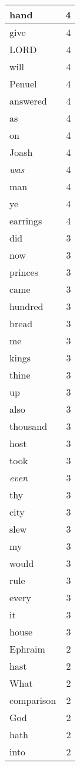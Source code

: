 \begin{center}
\begin{longtable}{l|r}
hand & 4\\ \hline 
give & 4\\ \hline 
LORD & 4\\ \hline 
will & 4\\ \hline 
Penuel & 4\\ \hline 
answered & 4\\ \hline 
as & 4\\ \hline 
on & 4\\ \hline 
Joash & 4\\ \hline 
\emph{was} & 4\\ \hline 
man & 4\\ \hline 
ye & 4\\ \hline 
earrings & 4\\ \hline 
did & 3\\ \hline 
now & 3\\ \hline 
princes & 3\\ \hline 
came & 3\\ \hline 
hundred & 3\\ \hline 
bread & 3\\ \hline 
me & 3\\ \hline 
kings & 3\\ \hline 
thine & 3\\ \hline 
up & 3\\ \hline 
also & 3\\ \hline 
thousand & 3\\ \hline 
host & 3\\ \hline 
took & 3\\ \hline 
\emph{even} & 3\\ \hline 
thy & 3\\ \hline 
city & 3\\ \hline 
slew & 3\\ \hline 
my & 3\\ \hline 
would & 3\\ \hline 
rule & 3\\ \hline 
every & 3\\ \hline 
it & 3\\ \hline 
house & 3\\ \hline 
Ephraim & 2\\ \hline 
hast & 2\\ \hline 
What & 2\\ \hline 
comparison & 2\\ \hline 
God & 2\\ \hline 
hath & 2\\ \hline 
into & 2\\ \hline 

\end{longtable}
\end{center}
